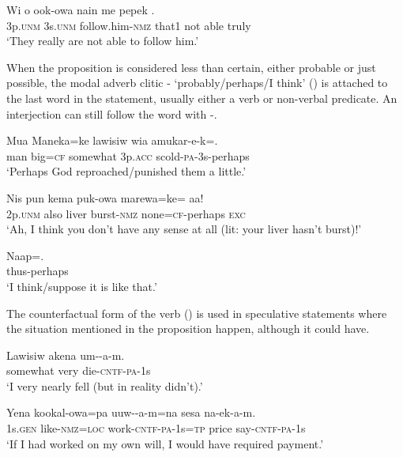 \ea%
\label{ex:x1051}
\gll Wi  o  ook-owa  nain  me  pepek  . \\
3p.\textsc{unm}  3s.\textsc{unm}  follow.him-\textsc{nmz}  that1  not  able  truly\\
\glt `They really are not able to follow him.'
\z

When the proposition is considered less than certain, either probable or just possible, the modal adverb clitic - `probably/perhaps/I think' () is attached to the last word in the statement, usually either a verb or non-verbal predicate. An interjection can still follow the word with -.

\ea%
\label{ex:x1052}
\gll Mua  Maneka=ke  lawisiw  wia  amukar-e-k=. \\
man  big=\textsc{cf}  somewhat  3p.\textsc{acc}  scold-\textsc{pa}-3s-perhaps\\
\glt `Perhaps God reproached/punished them a little.'
\z

\ea%
\label{ex:x1053}
\gll Nis  pun  kema  puk-owa  marewa=ke=  aa! \\
2p.\textsc{unm}  also  liver  burst-\textsc{nmz}  none=\textsc{cf}-perhaps  \textsc{exc}\\
\glt `Ah, I think you don't have any sense at all (lit: your liver hasn't burst)!'
\z

\ea%
\label{ex:x1071}
\gll Naap=. \\
thus-perhaps\\
\glt `I think/suppose it is like that.'
\z

The counterfactual form of the verb () is used in speculative statements where the situation mentioned in the proposition  happen, although it could have. 

\ea%
\label{ex:x1054}
\gll Lawisiw  akena  um--a-m. \\
somewhat  very  die-\textsc{cntf}-\textsc{pa}-1s\\
\glt `I very nearly fell (but in reality didn't).'
\z

\ea%
\label{ex:x1055}
\gll Yena  kookal-owa=pa  uuw--a-m=na  sesa  na-ek-a-m. \\
1s.\textsc{gen}  like-\textsc{nmz}=\textsc{loc}  work-\textsc{cntf}-\textsc{pa}-1s=\textsc{tp}  price  say-\textsc{cntf}-\textsc{pa}-1s\\
\glt `If I had worked on my own will, I would have required payment.'
\z

